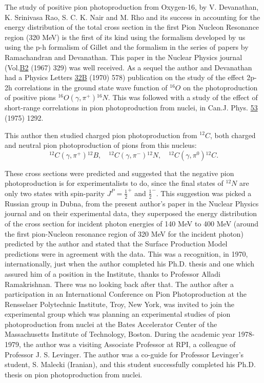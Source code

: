 The study of positive pion photoproduction from Oxygen-16, by V. Devanathan, K. Srinivasa Rao, S. C. K. Nair and M. Rho and its success in accounting for the energy distribution of the total cross section in the first Pion Nucleon Resonance region (320 MeV) is the first of its kind using the formalism developed by us using the p-h formalism of Gillet and the formalism in the series of papers by Ramachandran and Devanathan. This paper in the Nuclear Physics journal (Vol.\underline{B2} (1967) 329) was well received. As a sequel the author and Devanathan had a Physics Letters \underline{32B} (1970) 578) publication on the study of the effect 2p-2h correlations in the ground state wave function of $^{16}O$ on the photoproduction of positive pions $^{16}O(\gamma, \pi^+){}^{16}N$. This was followed with a study of the effect of short-range correlations in pion photoproduction from nuclei, in Can.J. Phys. \underline{53} (1975) 1292.

This author then studied charged pion photoproduction from $^{12}C$, both charged and neutral pion photoproduction of pions from this nucleus:
$$
{}^{12}C(\gamma, \pi^+){}^{12}B, \quad  {}^{12}C(\gamma, \pi^-){}^{12}N, \quad 
{}^{12}C(\gamma, \pi^0){}^{12}C.
$$

These cross sections were predicted and suggested that the negative pion photoproduction is for experimentalists to do, since the final states of ${}^{12}N$ are only two states with spin-parity $J^P=\frac{1}{2}^+$ and $\frac{1}{2}^-$. This suggestion was picked a Russian group in Dubna, from the present author's paper in the Nuclear Physics journal and on their experimental data, they superposed the energy distribution of the cross section for incident photon energies of 140 MeV to 400 MeV (around the first pion-Nucleon resonance region of 320 MeV for the incident photon) predicted by the author and stated that the Surface Production Model predictions were in agreement with the data. This was a recognition, in 1970, internationally, just when the author completed his Ph.D. thesis and one which assured him of a position in the Institute, thanks to Professor Alladi Ramakrishnan. There was no looking back after that. The author after a participation in an International Conference on Pion Photoproduction at the Rensselaer Polytechnic Institute, Troy, New York, was invited to join the experimental group which was planning an experimental studies of pion photoproduction from nuclei at the Bates Accelerator Center of the Massachusetts Institute of Technology, Boston. During the academic year 1978-1979, the author was a visiting Associate Professor at RPI, a colleague of Professor J. S. Levinger. The author was a co-guide for Professor Levinger's student, S. Malecki (Iranian), and this student successfully completed his Ph.D. thesis on pion photoproduction from nuclei.

